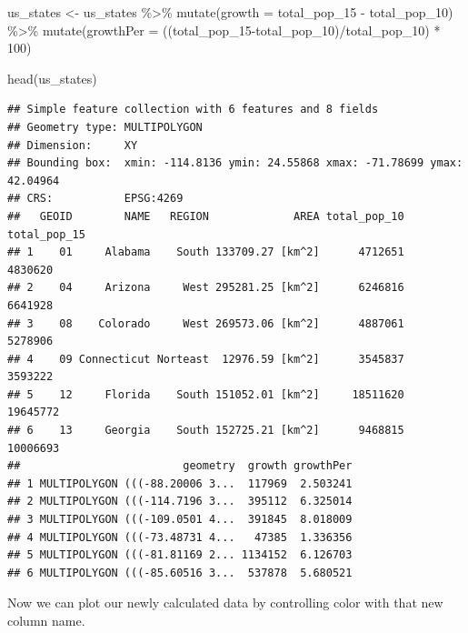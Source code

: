 \documentclass[
]{book}
\newenvironment{Shaded}{\begin{snugshade}}{\end{snugshade}}
\newcommand{\AttributeTok}[1]{\textcolor[rgb]{0.77,0.63,0.00}{#1}}
\newcommand{\DecValTok}[1]{\textcolor[rgb]{0.00,0.00,0.81}{#1}}
\newcommand{\FunctionTok}[1]{\textcolor[rgb]{0.00,0.00,0.00}{#1}}
\newcommand{\NormalTok}[1]{#1}
\newcommand{\OtherTok}[1]{\textcolor[rgb]{0.56,0.35,0.01}{#1}}
\newcommand{\SpecialCharTok}[1]{\textcolor[rgb]{0.00,0.00,0.00}{#1}}
\begin{document}
\begin{Shaded}
\begin{Highlighting}[]
\NormalTok{us\_states }\OtherTok{\textless{}{-}}\NormalTok{ us\_states }\SpecialCharTok{\%\textgreater{}\%} 
  \FunctionTok{mutate}\NormalTok{(}\AttributeTok{growth =}\NormalTok{ total\_pop\_15 }\SpecialCharTok{{-}}\NormalTok{ total\_pop\_10) }\SpecialCharTok{\%\textgreater{}\%}
  \FunctionTok{mutate}\NormalTok{(}\AttributeTok{growthPer =}\NormalTok{ ((total\_pop\_15}\SpecialCharTok{{-}}\NormalTok{total\_pop\_10)}\SpecialCharTok{/}\NormalTok{total\_pop\_10) }\SpecialCharTok{*} \DecValTok{100}\NormalTok{)}

\FunctionTok{head}\NormalTok{(us\_states)}
\end{Highlighting}
\end{Shaded}

\begin{verbatim}
## Simple feature collection with 6 features and 8 fields
## Geometry type: MULTIPOLYGON
## Dimension:     XY
## Bounding box:  xmin: -114.8136 ymin: 24.55868 xmax: -71.78699 ymax: 42.04964
## CRS:           EPSG:4269
##   GEOID        NAME   REGION             AREA total_pop_10 total_pop_15
## 1    01     Alabama    South 133709.27 [km^2]      4712651      4830620
## 2    04     Arizona     West 295281.25 [km^2]      6246816      6641928
## 3    08    Colorado     West 269573.06 [km^2]      4887061      5278906
## 4    09 Connecticut Norteast  12976.59 [km^2]      3545837      3593222
## 5    12     Florida    South 151052.01 [km^2]     18511620     19645772
## 6    13     Georgia    South 152725.21 [km^2]      9468815     10006693
##                         geometry  growth growthPer
## 1 MULTIPOLYGON (((-88.20006 3...  117969  2.503241
## 2 MULTIPOLYGON (((-114.7196 3...  395112  6.325014
## 3 MULTIPOLYGON (((-109.0501 4...  391845  8.018009
## 4 MULTIPOLYGON (((-73.48731 4...   47385  1.336356
## 5 MULTIPOLYGON (((-81.81169 2... 1134152  6.126703
## 6 MULTIPOLYGON (((-85.60516 3...  537878  5.680521
\end{verbatim}

Now we can plot our newly calculated data by controlling color with that new column name.
\end{document}
